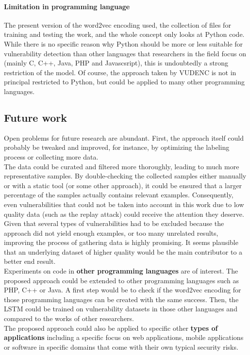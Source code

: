 \documentclass[
a4paper,
pagesize,
pdftex,
12pt,
twoside, %
BCOR=5mm, %
ngerman,
fleqn,
final,
]{scrartcl}
\begin{document}
	\paragraph{Limitation in programming language}
	The present version of the word2vec encoding used, the collection of files for training and testing the work, and the whole concept only looks at Python code. While there is no specific reason why Python should be more or less suitable for vulnerability detection than other languages that researchers in the field focus on (mainly C, C++, Java, PHP and Javascsript), this is undoubtedly a strong restriction of the model. Of course, the approach taken by VUDENC is not in principal restricted to Python, but could be applied to many other programming languages. 	
	\subsection{Future work}
	Open problems for future research are abundant. First, the approach itself could probably be tweaked and improved, for instance, by optimizing the labeling process or collecting more data.\\
	The data could be curated and filtered more thoroughly, leading to much more representative samples. By double-checking the collected samples either manually or with a static tool (or some other approach), it could be ensured that a larger percentage of the samples actually contains relevant examples. Consequently, even vulnerabilities that could not be taken into account in this work due to low quality data (such as the replay attack) could receive the attention they deserve. Given that several types of vulnerabilities had to be excluded because the approach did not yield enough examples, or too many unrelated results, improving the process of gathering data is highly promising. It seems plausible that an underlying dataset of higher quality would be the main contributor to a better end result.\\
	Experiments on code in \textbf{other programming languages} are of interest. The proposed approach could be extended to other programming languages such as PHP, C++ or Java. A first step would be to check if the word2vec encoding for those programming languages can be created with the same success. Then, the LSTM could be trained on vulnerability datasets in those other languages and compared to the works of other researchers. \\
	The proposed approach could also be applied to specific other \textbf{types of applications} including a specific focus on web applications, mobile applications or software in specific domains that come with their own typical security risks.\\
\end{document}
